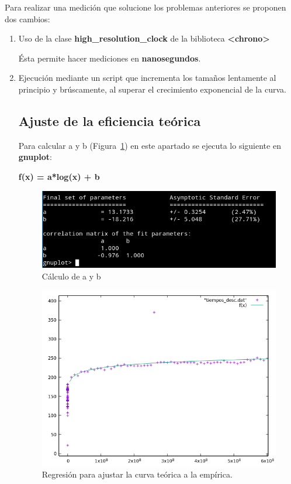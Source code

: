 Para realizar una medición que solucione los problemas anteriores se proponen dos cambios:
\begin{enumerate}
	\item Uso de la clase \textbf{high\_resolution\_clock} de la biblioteca \textbf{<chrono>}
	
	Ésta permite hacer mediciones en \textbf{nanosegundos}.
	
	\item Ejecución mediante un script que incrementa los tamaños lentamente al principio y brúscamente, al superar el crecimiento exponencial de la curva. 
	
	
\subsection{Ajuste de la eficiencia teórica}
	
	Para calcular a y b (Figura~\ref{fig:figura3-1}) en este apartado se ejecuta lo siguiente en \textbf{gnuplot}:
	
\textbf{f(x) = a*log(x) + b}

\begin{figure}[H] %
\centering
\includegraphics[scale=0.6]{ejercicio3/plot3-1.png}  
\caption{Cálculo de a y b} 
\label{fig:figura3-1}
\end{figure}

\begin{figure}[H] %
\centering
\includegraphics[scale=0.8]{ejercicio3/plot3-2.png}  
\caption{Regresión para ajustar la curva teórica a la empírica.} 
\label{fig:figura3-2}
\end{figure}

\end{enumerate}



